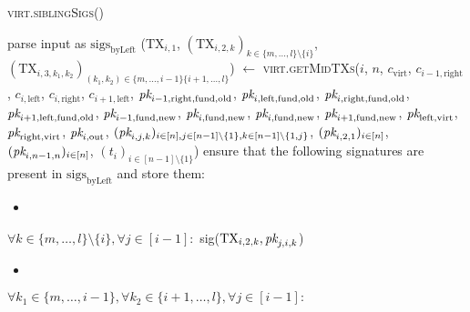 \begin{center}
  \begin{processbox}{\textsc{virt.siblingSigs}()}
    \begin{algorithmic}[1]
      \State parse input as $\mathrm{sigs}_{\mathrm{byLeft}}$
      \State ($\mathrm{TX}_{i, 1}$, $(\mathrm{TX}_{i, 2, k})_{k \in \{m, \dots,
      l\} \setminus \{i\}}$, $(\mathrm{TX}_{i, 3, k_1, k_2})_{(k_1, k_2) \in
      \{m, \dots, i-1\} \{i+1, \dots, l\}}$) $\gets$
      \textsc{virt.getMidTXs}($i$, $n$, $c_{\mathrm{virt}}$, $c_{i-1,
      \mathrm{right}}$, $c_{i, \mathrm{left}}$, $c_{i, \mathrm{right}}$,
      $c_{i+1, \mathrm{left}}$, $\textit{pk}_{i-1, \mathrm{right}, \mathrm{fund},
      \mathrm{old}}$, $\textit{pk}_{i, \mathrm{left}, \mathrm{fund}, \mathrm{old}}$,
      $\textit{pk}_{i, \mathrm{right}, \mathrm{fund}, \mathrm{old}}$, $\textit{pk}_{i+1,
      \mathrm{left}, \mathrm{fund}, \mathrm{old}}$, $\textit{pk}_{i-1, \mathrm{fund},
      \mathrm{new}}$, $\textit{pk}_{i, \mathrm{fund}, \mathrm{new}}$, $\textit{pk}_{i,
      \mathrm{fund}, \mathrm{new}}$, $\textit{pk}_{i+1, \mathrm{fund}, \mathrm{new}}$,
      $\textit{pk}_{\mathrm{left}, \mathrm{virt}}$, $\textit{pk}_{\mathrm{right}, \mathrm{virt}}$,
      $\textit{pk}_{i, \mathrm{out}}$, $(\textit{pk}_{i,j,k})_{i \in [n], j \in [n-1] \setminus
      \{1\}, k \in [n-1] \setminus \{1, j\}}$, $(\textit{pk}_{i, 2, 1})_{i \in [n]}$,
      $(\textit{pk}_{i, n-1, n})_{i \in [n]}$, $(t_i)_{i \in [n-1] \setminus \{1\}}$)
      \Statex
      \State {}
      \State ensure that the following signatures are present in
      $\mathrm{sigs}_{\mathrm{byLeft}}$ and store them:
      \begin{itemize}
        \item {}
      \end{itemize}
      \Indent
        \State $\forall k \in \{m, \dots, l\} \setminus \{i\}, \forall j \in
        [i-1]:$
        \Indent
          \State sig($\mathrm{TX}_{i, 2, k}, \textit{pk}_{j, i, k}$)
        \EndIndent
      \EndIndent
      \begin{itemize}
        \item {}
      \end{itemize}
      \Indent
        \State $\forall k_1 \in \{m, \dots, i-1\}, \forall k_2 \in \{i+1, \dots,
        l\}, \forall j \in [i-1]:$

\end{algorithmic}
\end{processbox}
\end{center}
